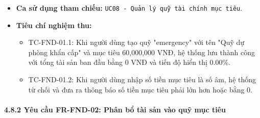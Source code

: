 \documentclass[11pt,a4paper]{article}
\providecommand{\tightlist}{
  \setlength{\itemsep}{0pt}\setlength{\parskip}{0pt}}
\begin{document}
\begin{itemize}
  \begin{itemize}
  \tightlist
  \item
    Đối tượng quỹ mục tiêu mới được lưu thành công kèm mã
    \texttt{fundCode}.
  \item
    Thông báo thiết lập quỹ mục tiêu thành công.
  \end{itemize}
\item
  \textbf{Ca sử dụng tham chiếu:}
  \texttt{UC08\ -\ Quản\ lý\ quỹ\ tài\ chính\ mục\ tiêu}.
\item
  \textbf{Tiêu chí nghiệm thu:}

  \begin{itemize}
  \tightlist
  \item
    TC-FND-01.1: Khi người dùng tạo quỹ "emergency" với tên "Quỹ dự
    phòng khẩn cấp" và mục tiêu 60,000,000 VNĐ, hệ thống lưu thành công
    với tổng tài sản ban đầu bằng 0 VNĐ và tiến độ hiển thị 0.00\%.
  \item
    TC-FND-01.2: Khi người dùng nhập số tiền mục tiêu là số âm, hệ thống
    từ chối và đưa ra thông báo số tiền mục tiêu phải lớn hơn hoặc bằng
    0.
  \end{itemize}
\end{itemize}

\paragraph{4.8.2 Yêu cầu FR-FND-02: Phân bổ tài sản vào quỹ mục
tiêu}\label{482-yuxeau-cux1ea7u-fr-fnd-02-phuxe2n-bux1ed5-tuxe0i-sux1ea3n-vuxe0o-quux1ef9-mux1ee5c-tiuxeau}
\end{document}
